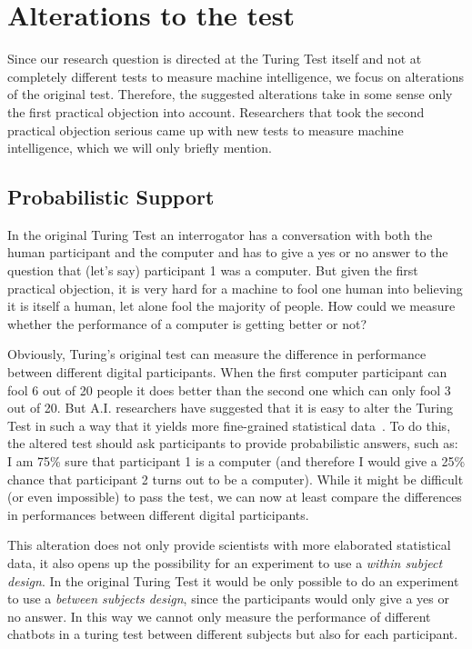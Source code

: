 \section{Alterations to the test}
Since our research question is directed at the Turing Test itself and not at completely different tests to measure machine intelligence, we focus on alterations of the original test. Therefore, the suggested alterations take in some sense only the first practical objection into account. Researchers that took the second practical objection serious came up with new tests to measure machine intelligence, which we will only briefly mention.

\subsection{Probabilistic Support}
In the original Turing Test an interrogator has a conversation with both the human participant and the computer and has to give a yes or no answer to the question that (let's say) participant 1 was a computer. But given the first practical objection, it is very hard for a machine to fool one human into believing it is itself a human, let alone fool the majority of people. How could we measure whether the performance of a computer is getting better or not?

Obviously, Turing's original test can measure the difference in performance between different digital participants. When the first computer participant can fool 6 out of 20 people it does better than the second one which can only fool 3 out of 20. But A.I. researchers have suggested that it is easy to alter the Turing Test in such a way that it yields more fine-grained statistical data~\cite{searle1980minds}. To do this, the altered test should ask participants to provide probabilistic answers, such as: I am 75\% sure that participant 1 is a computer (and therefore I would give a 25\% chance that participant 2 turns out to be a computer). While it might be difficult (or even impossible) to pass the test, we can now at least compare the differences in performances between different digital participants.

This alteration does not only provide scientists with more elaborated statistical data, it also opens up the possibility for an experiment to use a \textit{within subject design}. In the original Turing Test it would be only possible to do an experiment to use a \textit{between subjects design}, since the participants would only give a yes or no answer. In this way we cannot only measure the performance of different chatbots in a turing test between different subjects but also for each participant.


